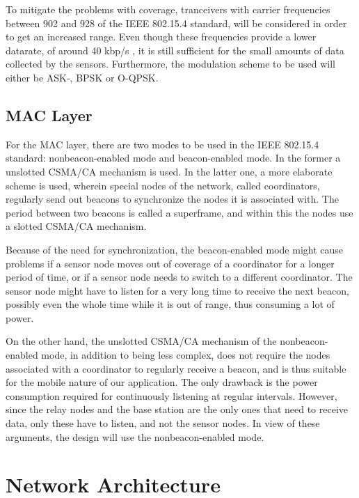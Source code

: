 \documentclass[conference]{IEEEtran}
\begin{document}
To mitigate the problems with coverage, tranceivers with carrier frequencies
between 902 and 928 of the IEEE 802.15.4 standard, will be considered in order
to get an increased range. Even though these frequencies provide a lower
datarate, of around 40 kbp/s \cite{ieee_computer_society_ieee_2011}, it is
still sufficient for the small amounts of data collected by the sensors.
Furthermore, the modulation scheme to be used will either be ASK-, BPSK or
O-QPSK.

\subsection{MAC Layer}

For the MAC layer, there are two modes to be used in the IEEE 802.15.4
standard: nonbeacon-enabled mode and beacon-enabled mode. In the former
a unslotted CSMA/CA mechanism is used. In the latter one, a more elaborate
scheme is used, wherein special nodes of the network, called coordinators,
regularly send out beacons to synchronize the nodes it is associated with. The
period between two beacons is called a superframe, and within this the nodes
use a slotted CSMA/CA mechanism.

Because of the need for synchronization, the beacon-enabled mode might cause
problems if a sensor node moves out of coverage of a coordinator for a longer
period of time, or if a sensor node needs to switch to a different coordinator.
The sensor node might have to listen for a very long time to receive the next
beacon, possibly even the whole time while it is out of range, thus consuming
a lot of power.

On the other hand, the unslotted CSMA/CA mechanism of the nonbeacon-enabled
mode, in addition to being less complex, does not require the nodes associated
with a coordinator to regularly receive a beacon, and is thus suitable for the
mobile nature of our application. The only drawback is the power consumption
required for continuously listening at regular intervals.  However, since the
relay nodes and the base station are the only ones that need to receive data,
only these have to listen, and not the sensor nodes. In view of these
arguments, the design will use the nonbeacon-enabled mode.



\section{Network Architecture}
\end{document}
